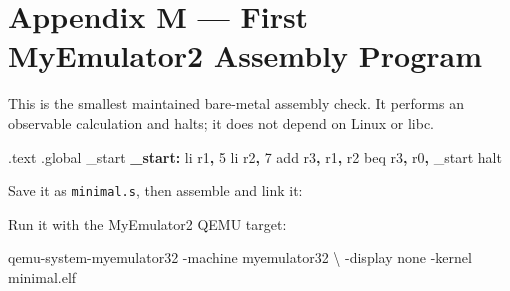 \documentclass[
  oneside,
  openany]{book}
\newenvironment{Shaded}{\begin{snugshade}}{\end{snugshade}}
\newcommand{\AttributeTok}[1]{\textcolor[rgb]{0.13,0.29,0.53}{#1}}
\newcommand{\BuiltInTok}[1]{#1}
\newcommand{\DataTypeTok}[1]{\textcolor[rgb]{0.13,0.29,0.53}{#1}}
\newcommand{\DecValTok}[1]{\textcolor[rgb]{0.00,0.00,0.81}{#1}}
\newcommand{\ExtensionTok}[1]{#1}
\newcommand{\FunctionTok}[1]{\textcolor[rgb]{0.13,0.29,0.53}{\textbf{#1}}}
\newcommand{\NormalTok}[1]{#1}
\newcommand{\OperatorTok}[1]{\textcolor[rgb]{0.81,0.36,0.00}{\textbf{#1}}}
\newcommand{\VariableTok}[1]{\textcolor[rgb]{0.00,0.00,0.00}{#1}}
\begin{document}
\hypertarget{appendix-m-first-myemulator2-assembly-program}{%
\chapter{Appendix M --- First MyEmulator2 Assembly
Program}\label{appendix-m-first-myemulator2-assembly-program}}

This is the smallest maintained bare-metal assembly check. It performs
an observable calculation and halts; it does not depend on Linux or
libc.

\begin{Shaded}
\begin{Highlighting}[]
\NormalTok{.text}
\NormalTok{.global \_start}
\FunctionTok{\_start:}
\NormalTok{        li   r1}\OperatorTok{,} \DecValTok{5}
\NormalTok{        li   r2}\OperatorTok{,} \DecValTok{7}
        \BuiltInTok{add}\NormalTok{  r3}\OperatorTok{,}\NormalTok{ r1}\OperatorTok{,}\NormalTok{ r2}
\NormalTok{        beq  r3}\OperatorTok{,}\NormalTok{ r0}\OperatorTok{,}\NormalTok{ \_start}
\NormalTok{        halt}
\end{Highlighting}
\end{Shaded}

Save it as \texttt{minimal.s}, then assemble and link it:

\begin{Shaded}
\end{Shaded}

Run it with the MyEmulator2 QEMU target:

\begin{Shaded}
\begin{Highlighting}[]
\ExtensionTok{qemu{-}system{-}myemulator32} \AttributeTok{{-}machine}\NormalTok{ myemulator32 }\DataTypeTok{\textbackslash{}}
  \AttributeTok{{-}display}\NormalTok{ none }\AttributeTok{{-}kernel}\NormalTok{ minimal.elf}
\end{Highlighting}
\end{Shaded}
\end{document}
